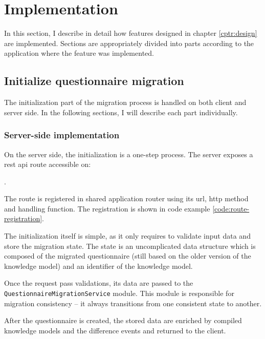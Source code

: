 \section{Implementation}\label{sec:implementation}

In this section, I describe in detail how features designed in chapter \ref{cptr:design} are implemented.
Sections are appropriately divided into parts according to the application where the feature was implemented.

\subsection{Initialize questionnaire migration}

The initialization part of the migration process is handled on both client and server side.
In the following sections, I will describe each part individually.

\subsubsection*{Server-side implementation}

On the server side, the initialization is a one-step process.
The server exposes a \gls{rest} \gls{api} route accessible on:
\begin{center}
    .
\end{center}

The route is registered in shared application router using its \gls{url}, \gls{http} method and handling function.
The registration is shown in code example \ref{code:route-registration}.


The initialization itself is simple, as it only requires to validate input data and store the migration state.
The state is an uncomplicated data structure which is composed of the migrated questionnaire (still based on the older version of the knowledge model) and an identifier of the knowledge model.

Once the request pass validations, its data are passed to the \texttt{Ques\-tion\-naire\-Migration\-Service} module.
This module is responsible for migration consistency -- it always transitions from one consistent state to another.

After the questionnaire is created, the stored data are enriched by compiled knowledge models and the difference events and returned to the client.

